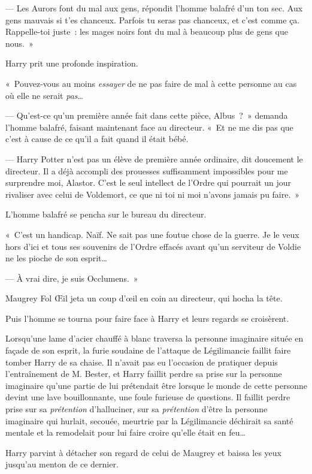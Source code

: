 --- Les Aurors font du mal aux gens, répondit l'homme balafré d'un ton sec.
Aux gens mauvais si t'es chanceux.
Parfois tu seras pas chanceux, et c'est comme ça.
Rappelle-toi juste~: les mages noirs font du mal à beaucoup plus de gens que nous.~»

Harry prit une profonde inspiration.

«~Pouvez-vous au moins \emph{essayer} de ne pas faire de mal à cette personne au cas où elle ne serait \emph{pas}…

--- Qu'est-ce qu'un première année fait dans cette pièce, Albus~?~»
demanda l'homme balafré, faisant maintenant face au directeur.
«~Et ne me dis pas que c'est à cause de ce qu'il a fait quand il était bébé.

--- Harry Potter n'est pas un élève de première année ordinaire, dit doucement le directeur.
Il a déjà accompli des prouesses suffisamment impossibles pour me surprendre moi, Alastor.
C'est le seul intellect de l'Ordre qui pourrait un jour rivaliser avec celui de Voldemort, ce que ni toi ni moi n'avons jamais pu faire.~»

L'homme balafré se pencha sur le bureau du directeur.

«~C'est un handicap.
Naïf. Ne sait pas une foutue chose de la guerre.
Je le veux hors d'ici et tous ses souvenirs de l'Ordre effacés avant qu'un serviteur de Voldie ne les pioche de son esprit…

--- À vrai dire, je suis Occlumens.~»

Maugrey Fol Œil jeta un coup d'œil en coin au directeur, qui hocha la tête.

Puis l'homme se tourna pour faire face à Harry et leurs regards se croisèrent.

Lorsqu'une lame d'acier chauffé à blanc traversa la personne imaginaire située en façade de son esprit, la furie soudaine de l'attaque de Légilimancie faillit faire tomber Harry de sa chaise.
Il n'avait pas eu l'occasion de pratiquer depuis l'entraînement de M. Bester, et Harry faillit perdre sa prise sur la personne imaginaire qu'une partie de lui prétendait être lorsque le monde de cette personne devint une lave bouillonnante, une foule furieuse de questions.
Il faillit perdre prise sur sa \emph{prétention} d'halluciner, sur sa \emph{prétention} d'être la personne imaginaire qui hurlait, secouée, meurtrie par la Légilimancie déchirait sa santé mentale et la remodelait pour lui faire croire qu'elle était en feu…

Harry parvint à détacher son regard de celui de Maugrey et baissa les yeux jusqu'au menton de ce dernier.

